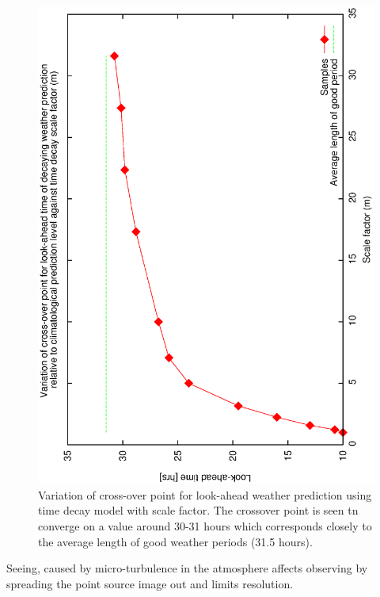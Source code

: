 \documentclass[12pt,a4paper]{article}
\begin{document}
{\begin{figure}[htbp]
  \begin{center}
    \includegraphics[scale=0.4, angle=-90]{figures/ecs/m_crossover.eps}
  \end{center}   
  \caption[Variation of cross-over point for look-ahead weather prediction using time decay model with scale factor.]
  {Variation of cross-over point for look-ahead weather prediction using time decay model with scale factor. The crossover point is seen tn converge on a value around 30-31 hours which corresponds closely to the average length of good weather periods (31.5 hours).}
  \label{fig:gbc_m_crossover}
\end{figure}


Seeing, caused by micro-turbulence in the atmosphere affects observing by spreading the point source image out and limits resolution.

}
\end{document}
